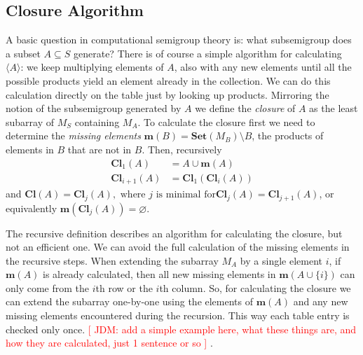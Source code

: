 \documentclass{amsart}
\newcommand{\Set}{\mathbf{Set}}
\newcommand{\Miss}{\mathbf{m}}
\newcommand{\Closure}{\mathbf{Cl}}
\newcommand{\todo}[1]{\textcolor{red}{ \small \textsf{[ #1 ]} \normalsize}}
\theoremstyle{plain}
\theoremstyle{definition}
\begin{document}
\subsection{Closure Algorithm}
A basic question in computational semigroup theory is: what subsemigroup does a subset $A\subseteq S$ generate?
There is of course a simple algorithm for calculating $\langle A\rangle$: we keep multiplying elements of $A$, also with any new elements until all the possible products yield an element already in the collection.
We can do this calculation directly on the table just by looking up products. 
Mirroring the notion of the subsemigroup generated by $A$ we define the
\emph{closure} of $A$ as the least subarray of $M_S$ containing $M_A$. %
To calculate
the closure first we need to determine the \emph{missing elements}
$\Miss(B)=\Set(M_B)\setminus B$, the products of elements in
$B$ that are not in $B$.%
Then, recursively \begin{align*}
\Closure_1(A)&=A\cup\Miss(A)\\ \Closure_{i+1}(A)&=\Closure_1(\Closure_{i}(A))
\end{align*} and $ \Closure(A)=\Closure_j(A), \text{ where $j$ is minimal for
}\Closure_j(A)=\Closure_{j+1}(A)$, or equivalently
$\Miss(\Closure_j(A))=\varnothing$.

The recursive definition describes an algorithm for calculating the closure, but not an efficient one. 
We can avoid the full calculation of the missing elements in the recursive steps.
When extending the subarray $M_A$ by a single element $i$, if $\Miss(A)$ is already calculated, then all new missing elements in $\Miss(A\cup\{i\})$ can only come from the $i$th row or the $i$th column.
So, for calculating the closure we can extend the subarray one-by-one using the elements of $\Miss(A)$ and any new missing elements encountered during the recursion.
This way each table entry is checked only once.\todo{JDM: add a simple example here, what these things are, and how they are calculated,
just 1 sentence or so}.
\end{document}
